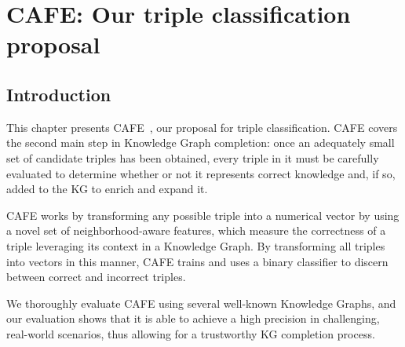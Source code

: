 \chapter{CAFE: Our triple classification proposal}\label{chap:cafe}



\section{Introduction}\label{sec:cafe-intro}
This chapter presents CAFE~\cite{borrego2021}, our proposal for triple classification. CAFE covers the second main step in Knowledge Graph completion: once an adequately small set of candidate triples has been obtained, every triple in it must be carefully evaluated to determine whether or not it represents correct knowledge and, if so, added to the KG to enrich and expand it.

CAFE works by transforming any possible triple into a numerical vector by using a novel set of neighborhood-aware features, which measure the correctness of a triple leveraging its context in a Knowledge Graph. By transforming all triples into vectors in this manner, CAFE trains and uses a binary classifier to discern between correct and incorrect triples.

We thoroughly evaluate CAFE using several well-known Knowledge Graphs, and our evaluation shows that it is able to achieve a high precision in challenging, real-world scenarios, thus allowing for a trustworthy KG completion process.

